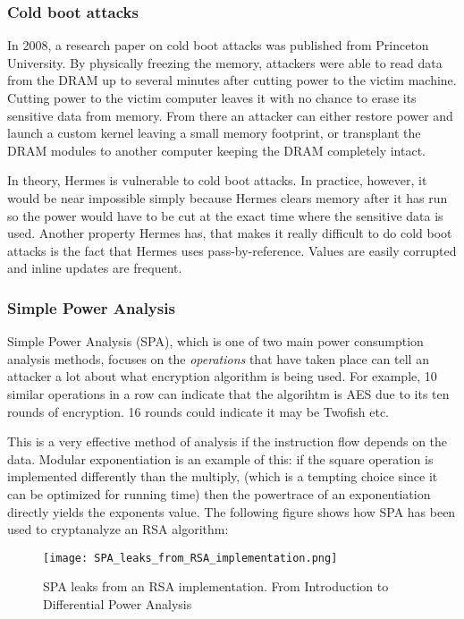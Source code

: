 \subsubsection{Cold boot attacks}
In 2008, a research paper on cold boot attacks\cite{Halderman2008LestKeys} was published from Princeton University. By physically freezing the memory, attackers were able to read data from the DRAM up to several minutes after cutting power to the victim machine. Cutting power to the victim computer leaves it with no chance to erase its sensitive data from memory. From there an attacker can either restore power and launch a custom kernel leaving a small memory footprint, or transplant the DRAM modules to another computer keeping the DRAM completely intact.

In theory, Hermes is vulnerable to cold boot attacks. In practice, however, it would be near impossible simply because Hermes clears memory after it has run so the power would have to be cut at the exact time where the sensitive data is used. Another property Hermes has, that makes it really difficult to do cold boot attacks is the fact that Hermes uses pass-by-reference. Values are easily corrupted and inline updates are frequent.

\subsubsection{Simple Power Analysis}
Simple Power Analysis (SPA), which is one of two main power consumption analysis methods, focuses on the \emph{operations} that have taken place can tell an attacker a lot about what encryption algorithm is being used.
For example, 10 similar operations in a row can indicate that the algorihtm is AES due to its ten rounds of encryption. 16 rounds could indicate it may be Twofish etc.

This is a very effective method of analysis if the instruction flow depends on the data. 
Modular exponentiation is an example of this: if the square operation is implemented differently than the multiply, (which is a tempting choice since it can be optimized for running time) then the powertrace of an exponentiation directly yields the exponents value.
The following figure shows how SPA has been used to cryptanalyze an RSA algorithm:
\begin{figure}[htp]
  \begin{center}
    \texttt{[image: SPA\_leaks\_from\_RSA\_implementation.png]} \\
  \end{center}
  \caption[caption]{SPA leaks from an RSA implementation. \hspace{\textwidth} From Introduction to Differential Power Analysis \cite{KOCHER2011}}
\end{figure}


